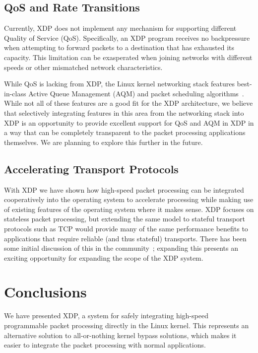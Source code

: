 \documentclass[10pt,sigconf]{acmart}
\begin{document}
\subsection{QoS and Rate Transitions}
\label{sec:handl-rate-trans}
Currently, XDP does not implement any mechanism for supporting different Quality
of Service (QoS). Specifically, an XDP program receives no backpressure when
attempting to forward packets to a destination that has exhausted its capacity.
This limitation can be exasperated when joining networks with different speeds
or other mismatched network characteristics.

While QoS is lacking from XDP, the Linux kernel networking stack features
best-in-class Active Queue Management (AQM) and packet scheduling
algorithms~\cite{good-bad-wifi}. While not all of these features are a good fit
for the XDP architecture, we believe that selectively integrating features in
this area from the networking stack into XDP is an opportunity to provide
excellent support for QoS and AQM in XDP in a way that can be completely
transparent to the packet processing applications themselves. We are planning to
explore this further in the future.

\subsection{Accelerating Transport Protocols}
\label{sec:accel-transp-prot}

With XDP we have shown how high-speed packet processing can be integrated
cooperatively into the operating system to accelerate processing while making
use of existing features of the operating system where it makes sense. XDP
focuses on stateless packet processing, but extending the same model to stateful
transport protocols such as TCP would provide many of the same performance
benefits to applications that require reliable (and thus stateful) transports.
There has been some initial discussion of this in the community~\cite{txdp};
expanding this presents an exciting opportunity for expanding the scope of the
XDP system.

\section{Conclusions}
\label{sec:conclusion}
We have presented XDP, a system for safely integrating high-speed programmable
packet processing directly in the Linux kernel. This represents an alternative
solution to all-or-nothing kernel bypass solutions, which makes it easier to
integrate the packet processing with normal applications.
\end{document}
